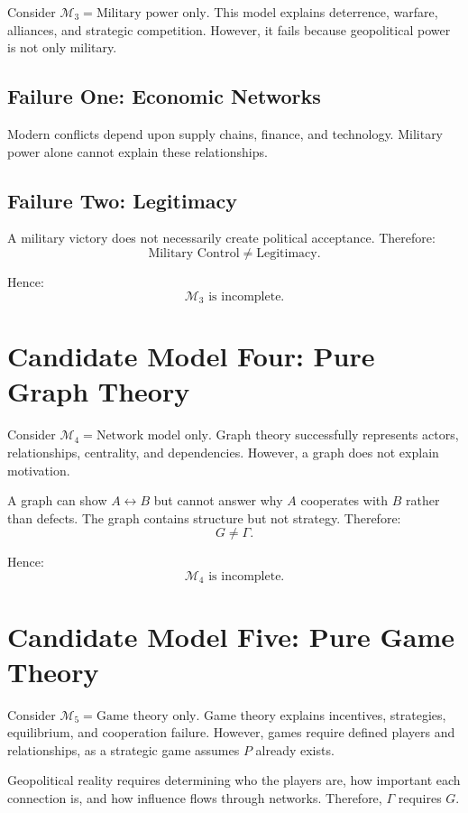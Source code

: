 \documentclass[11pt,openany]{book}
\theoremstyle{plain}
\theoremstyle{definition}
\begin{document}
Consider \(\mathcal{M}_3 = \text{Military power only}\). This model explains deterrence, warfare, alliances, and strategic competition. However, it fails because geopolitical power is not only military.

\subsection*{Failure One: Economic Networks}

Modern conflicts depend upon supply chains, finance, and technology. Military power alone cannot explain these relationships.

\subsection*{Failure Two: Legitimacy}

A military victory does not necessarily create political acceptance. Therefore:
\[
\text{Military Control} \neq \text{Legitimacy}.
\]

Hence:
\[
\boxed{
\mathcal{M}_3 \text{ is incomplete.}
}
\]

\section*{Candidate Model Four: Pure Graph Theory}

Consider \(\mathcal{M}_4 = \text{Network model only}\). Graph theory successfully represents actors, relationships, centrality, and dependencies. However, a graph does not explain motivation. 

A graph can show \(A \leftrightarrow B\) but cannot answer why \(A\) cooperates with \(B\) rather than defects. The graph contains structure but not strategy. Therefore:
\[
\boxed{
G \neq \Gamma.
}
\]

Hence:
\[
\boxed{
\mathcal{M}_4 \text{ is incomplete.}
}
\]

\section*{Candidate Model Five: Pure Game Theory}

Consider \(\mathcal{M}_5 = \text{Game theory only}\). Game theory explains incentives, strategies, equilibrium, and cooperation failure. However, games require defined players and relationships, as a strategic game assumes \(P\) already exists.

Geopolitical reality requires determining who the players are, how important each connection is, and how influence flows through networks. Therefore, \(\Gamma\) requires \(G\).
\end{document}
